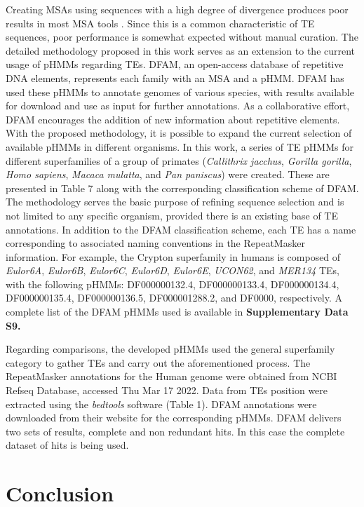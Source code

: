 \documentclass[unnumsec,webpdf,contemporary,large]{oup-authoring-template}%
\theoremstyle{thmstyleone}%
\theoremstyle{thmstyletwo}%
\theoremstyle{thmstylethree}%
\begin{document}
Creating MSAs using sequences with a high degree of divergence produces poor results in most MSA tools \cite{hubley_accuracy_2022}. Since this is a common characteristic of TE sequences, poor performance is somewhat expected without manual curation. The detailed methodology proposed in this work serves as an extension to the current usage of pHMMs regarding TEs. DFAM, an open-access database of repetitive DNA elements, represents each family with an MSA and a pHMM. DFAM has used these pHMMs to annotate genomes of various species, with results available for download and use as input for further annotations. As a collaborative effort, DFAM encourages the addition of new information about repetitive elements. With the proposed methodology, it is possible to expand the current selection of available pHMMs in different organisms. In this work, a series of TE pHMMs for different superfamilies of a group of primates (\textit{Callithrix jacchus}, \textit{Gorilla gorilla}, \textit{Homo sapiens}, \textit{Macaca mulatta}, and \textit{Pan paniscus}) were created. These are presented in Table 7 along with the corresponding classification scheme of DFAM. The methodology serves the basic purpose of refining sequence selection and is not limited to any specific organism, provided there is an existing base of TE annotations. In addition to the DFAM classification scheme, each TE has a name corresponding to associated naming conventions in the RepeatMasker information. For example, the Crypton superfamily in humans is composed of \textit{Eulor6A}, \textit{Eulor6B}, \textit{Eulor6C}, \textit{Eulor6D}, \textit{Eulor6E}, \textit{UCON62}, and \textit{MER134} TEs, with the following pHMMs: DF000000132.4, DF000000133.4, DF000000134.4, DF000000135.4, DF000000136.5, DF000001288.2, and DF0000, respectively. A complete list of the DFAM pHMMs used is available in \textbf{Supplementary Data S9.}

Regarding comparisons, the developed pHMMs used the general superfamily category to gather TEs and carry out the aforementioned process. The RepeatMasker annotations for the Human genome were obtained from NCBI Refseq Database, accessed Thu Mar 17 2022. Data from TEs position were extracted using the \textit{bedtools} software (Table 1). DFAM annotations were downloaded from their website for the corresponding pHMMs. DFAM delivers two sets of results, complete and non redundant hits. In this case the complete dataset of hits is being used.


\section{Conclusion}\label{sec5}
\end{document}
